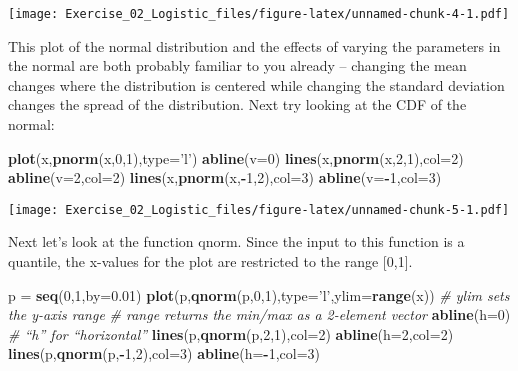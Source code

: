 \documentclass[]{article}
\newenvironment{Shaded}{\begin{snugshade}}{\end{snugshade}}
\newcommand{\KeywordTok}[1]{\textcolor[rgb]{0.13,0.29,0.53}{\textbf{#1}}}
\newcommand{\DataTypeTok}[1]{\textcolor[rgb]{0.13,0.29,0.53}{#1}}
\newcommand{\DecValTok}[1]{\textcolor[rgb]{0.00,0.00,0.81}{#1}}
\newcommand{\FloatTok}[1]{\textcolor[rgb]{0.00,0.00,0.81}{#1}}
\newcommand{\StringTok}[1]{\textcolor[rgb]{0.31,0.60,0.02}{#1}}
\newcommand{\CommentTok}[1]{\textcolor[rgb]{0.56,0.35,0.01}{\textit{#1}}}
\newcommand{\OperatorTok}[1]{\textcolor[rgb]{0.81,0.36,0.00}{\textbf{#1}}}
\newcommand{\NormalTok}[1]{#1}
\begin{document}
\texttt{[image: Exercise\_02\_Logistic\_files/figure-latex/unnamed-chunk-4-1.pdf]}

This plot of the normal distribution and the effects of varying the
parameters in the normal are both probably familiar to you already --
changing the mean changes where the distribution is centered while
changing the standard deviation changes the spread of the distribution.
Next try looking at the CDF of the normal:

\begin{Shaded}
\begin{Highlighting}[]
\KeywordTok{plot}\NormalTok{(x,}\KeywordTok{pnorm}\NormalTok{(x,}\DecValTok{0}\NormalTok{,}\DecValTok{1}\NormalTok{),}\DataTypeTok{type=}\StringTok{'l'}\NormalTok{)}
\KeywordTok{abline}\NormalTok{(}\DataTypeTok{v=}\DecValTok{0}\NormalTok{)}
\KeywordTok{lines}\NormalTok{(x,}\KeywordTok{pnorm}\NormalTok{(x,}\DecValTok{2}\NormalTok{,}\DecValTok{1}\NormalTok{),}\DataTypeTok{col=}\DecValTok{2}\NormalTok{)}
\KeywordTok{abline}\NormalTok{(}\DataTypeTok{v=}\DecValTok{2}\NormalTok{,}\DataTypeTok{col=}\DecValTok{2}\NormalTok{)}
\KeywordTok{lines}\NormalTok{(x,}\KeywordTok{pnorm}\NormalTok{(x,}\OperatorTok{-}\DecValTok{1}\NormalTok{,}\DecValTok{2}\NormalTok{),}\DataTypeTok{col=}\DecValTok{3}\NormalTok{)}
\KeywordTok{abline}\NormalTok{(}\DataTypeTok{v=}\OperatorTok{-}\DecValTok{1}\NormalTok{,}\DataTypeTok{col=}\DecValTok{3}\NormalTok{)}
\end{Highlighting}
\end{Shaded}

\texttt{[image: Exercise\_02\_Logistic\_files/figure-latex/unnamed-chunk-5-1.pdf]}

Next let's look at the function qnorm. Since the input to this function
is a quantile, the x-values for the plot are restricted to the range
{[}0,1{]}.

\begin{Shaded}
\begin{Highlighting}[]
\NormalTok{p =}\StringTok{ }\KeywordTok{seq}\NormalTok{(}\DecValTok{0}\NormalTok{,}\DecValTok{1}\NormalTok{,}\DataTypeTok{by=}\FloatTok{0.01}\NormalTok{)}
\KeywordTok{plot}\NormalTok{(p,}\KeywordTok{qnorm}\NormalTok{(p,}\DecValTok{0}\NormalTok{,}\DecValTok{1}\NormalTok{),}\DataTypeTok{type=}\StringTok{'l'}\NormalTok{,}\DataTypeTok{ylim=}\KeywordTok{range}\NormalTok{(x))    }\CommentTok{# ylim sets the y-axis range}
\CommentTok{# range returns the min/max as a 2-element vector}
\KeywordTok{abline}\NormalTok{(}\DataTypeTok{h=}\DecValTok{0}\NormalTok{)                     }\CommentTok{# “h” for “horizontal”}
\KeywordTok{lines}\NormalTok{(p,}\KeywordTok{qnorm}\NormalTok{(p,}\DecValTok{2}\NormalTok{,}\DecValTok{1}\NormalTok{),}\DataTypeTok{col=}\DecValTok{2}\NormalTok{)}
\KeywordTok{abline}\NormalTok{(}\DataTypeTok{h=}\DecValTok{2}\NormalTok{,}\DataTypeTok{col=}\DecValTok{2}\NormalTok{)}
\KeywordTok{lines}\NormalTok{(p,}\KeywordTok{qnorm}\NormalTok{(p,}\OperatorTok{-}\DecValTok{1}\NormalTok{,}\DecValTok{2}\NormalTok{),}\DataTypeTok{col=}\DecValTok{3}\NormalTok{)}
\KeywordTok{abline}\NormalTok{(}\DataTypeTok{h=}\OperatorTok{-}\DecValTok{1}\NormalTok{,}\DataTypeTok{col=}\DecValTok{3}\NormalTok{)}
\end{Highlighting}
\end{Shaded}
\end{document}

